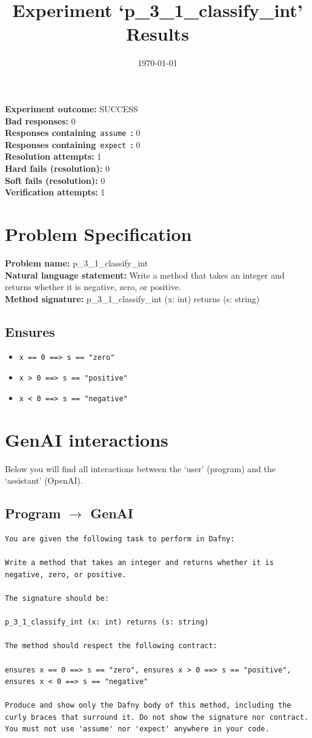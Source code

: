 \documentclass{article}
\begin{document}
\title{Experiment `p\_3\_1\_classify\_int' Results}
\author{\today}
\date{}
\maketitle
\textbf{Experiment outcome: }SUCCESS
\\\textbf{Bad responses: }0
\\\textbf{Responses containing}~\texttt{assume}~\textbf{: }0
\\\textbf{Responses containing}~\texttt{expect}~\textbf{: }0
\\\textbf{Resolution attempts: }1
\\\textbf{Hard fails (resolution): }0
\\\textbf{Soft fails (resolution): }0
\\\textbf{Verification attempts: }1
\section*{Problem Specification}
\textbf{Problem name: }p\_3\_1\_classify\_int
\\\textbf{Natural language statement: }Write a method that takes an integer and returns whether it is negative, zero, or positive.
\\\textbf{Method signature: }p\_3\_1\_classify\_int (x: int) returns (s: string)
\subsection*{Ensures}
\begin{itemize}
\item \texttt{x == 0 ==> s == "zero"}
\item \texttt{x > 0 ==> s == "positive"}
\item \texttt{x < 0 ==> s == "negative"}
\end{itemize}
\clearpage
\section*{GenAI interactions}
Below you will find all interactions between the `user' (program) and the `assistant' (OpenAI).
\subsection*{Program $\rightarrow$ GenAI}
\begin{lstlisting}
You are given the following task to perform in Dafny:

Write a method that takes an integer and returns whether it is negative, zero, or positive.

The signature should be:

p_3_1_classify_int (x: int) returns (s: string)

The method should respect the following contract:

ensures x == 0 ==> s == "zero", ensures x > 0 ==> s == "positive", ensures x < 0 ==> s == "negative"

Produce and show only the Dafny body of this method, including the curly braces that surround it. Do not show the signature nor contract. You must not use 'assume' nor 'expect' anywhere in your code.
\end{lstlisting}
\end{document}
